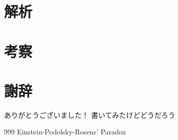 \documentclass[a4paper,10pt,dvipdfmx,titlepage]{jsarticle}
\numberwithin{equation}{section}
\begin{document}
\section{解析}

\section{考察}

\section{謝辞}
ありがとうございました！
書いてみたけどどうだろう

\begin{thebibliography}{999}
     Einstein-Podolsky-Rosens' Paradox
\end{thebibliography}



\end{document}
